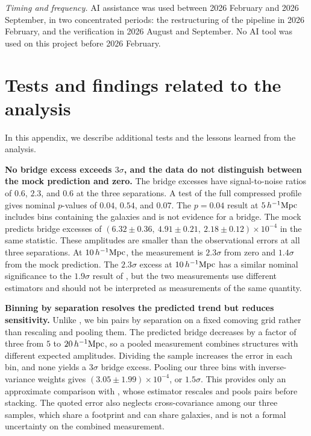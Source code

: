 \documentclass[preprint]{aastex701}
\newcommand{\hinvMpc}{h^{-1}{\rm Mpc}}
\begin{document}
\begin{acknowledgments}
\emph{Timing and frequency.} AI assistance was used between 2026 February and
2026 September, in two concentrated periods: the restructuring of the pipeline
in 2026 February, and the verification in 2026 August
and September. No AI tool was used on this project before 2026 February.

\end{acknowledgments}

\appendix

\section{Tests and findings related to the analysis}
\label{sec:appendix}

In this appendix, we describe additional tests and the lessons learned from the analysis.

\textbf{No bridge excess exceeds $3\sigma$, and the data do not distinguish
between the mock prediction and zero.} The bridge excesses have
signal-to-noise ratios of $0.6$, $2.3$, and $0.6$ at the three separations. A
test of the full compressed profile gives nominal $p$-values of $0.04$,
$0.54$, and $0.07$.
The $p=0.04$ result at $5\,\hinvMpc$ includes bins containing the galaxies and
is not evidence for a bridge. The mock predicts bridge excesses of
$\left(6.32\pm0.36,\ 4.91\pm0.21,\ 2.18\pm0.12\right)\times10^{-4}$ in the
same statistic. These amplitudes are smaller than the observational errors
at all three separations. At $10\,\hinvMpc$, the measurement is $2.3\sigma$
from zero and $1.4\sigma$ from the mock prediction.
The $2.3\sigma$ excess at $10\,\hinvMpc$ has a similar nominal significance
to the $1.9\sigma$ result of \citet{deGraaff2019}, but the two measurements
use different estimators and should not be interpreted as measurements of
the same quantity.

\textbf{Binning by separation resolves the predicted trend but reduces
sensitivity.} Unlike \citet{deGraaff2019}, we bin pairs by separation on a
fixed comoving grid rather than rescaling and pooling them. The predicted
bridge decreases by a factor of three from $5$ to $20\,\hinvMpc$, so a pooled
measurement combines structures with different expected amplitudes. Dividing
the sample increases the error in each bin, and none yields a $3\sigma$
bridge excess. Pooling our three bins with inverse-variance weights gives
$\left(3.05\pm1.99\right)\times10^{-4}$, or $1.5\sigma$. This provides only an
approximate comparison with \citet{deGraaff2019}, whose estimator rescales and
pools pairs before stacking. The quoted error also neglects cross-covariance among our
three samples, which share a footprint and can share galaxies, and is not a
formal uncertainty on the combined measurement.
\end{document}
